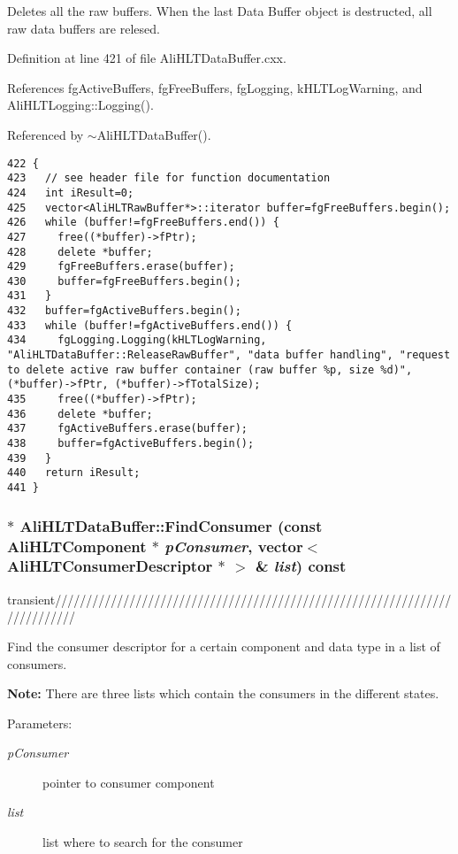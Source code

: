 Deletes all the raw buffers. When the last Data Buffer object is destructed, all raw data buffers are relesed. 

Definition at line 421 of file Ali\-HLTData\-Buffer.cxx.

References fg\-Active\-Buffers, fg\-Free\-Buffers, fg\-Logging, k\-HLTLog\-Warning, and Ali\-HLTLogging::Logging().

Referenced by $\sim$Ali\-HLTData\-Buffer().

\footnotesize\begin{verbatim}422 {
423   // see header file for function documentation
424   int iResult=0;
425   vector<AliHLTRawBuffer*>::iterator buffer=fgFreeBuffers.begin();
426   while (buffer!=fgFreeBuffers.end()) {
427     free((*buffer)->fPtr);
428     delete *buffer;
429     fgFreeBuffers.erase(buffer);
430     buffer=fgFreeBuffers.begin();
431   }
432   buffer=fgActiveBuffers.begin();
433   while (buffer!=fgActiveBuffers.end()) {
434     fgLogging.Logging(kHLTLogWarning, "AliHLTDataBuffer::ReleaseRawBuffer", "data buffer handling", "request to delete active raw buffer container (raw buffer %p, size %d)", (*buffer)->fPtr, (*buffer)->fTotalSize);
435     free((*buffer)->fPtr);
436     delete *buffer;
437     fgActiveBuffers.erase(buffer);
438     buffer=fgActiveBuffers.begin();
439   }
440   return iResult;
441 }
\end{verbatim}\normalsize 


\subsubsection{ $\ast$ Ali\-HLTData\-Buffer::Find\-Consumer (const {\bf Ali\-HLTComponent} $\ast$ {\em p\-Consumer}, vector$<$ {\bf Ali\-HLTConsumer\-Descriptor} $\ast$ $>$ \& {\em list}) const\hspace{0.3cm}{\tt  [private]}}\label{classAliHLTDataBuffer_d2}


transient/////////////////////////////////////////////////////////////////////////// 

Find the consumer descriptor for a certain component and data type in a list of consumers.\par
 {\bf Note:} There are three lists which contain the consumers in the different states. \begin{Desc}
\item[Parameters:]
\begin{description}
\item[{\em p\-Consumer}]pointer to consumer component \item[{\em list}]list where to search for the consumer \end{description}
\end{Desc}


